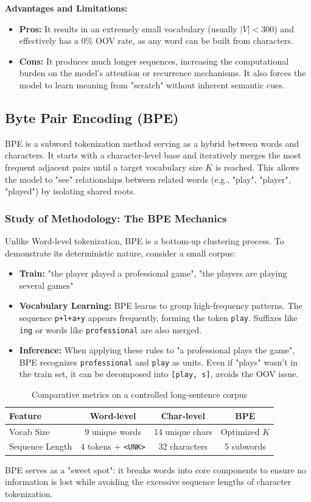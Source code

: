 \textbf{Advantages and Limitations:}
\begin{itemize}
    \item \textbf{Pros:} It results in an extremely small vocabulary (usually $|V| < 300$) and effectively has a 0\% OOV rate, as any word can be built from characters.
    \item \textbf{Cons:} It produces much longer sequences, increasing the computational burden on the model's attention or recurrence mechanisms. It also forces the model to learn meaning from "scratch" without inherent semantic cues.
\end{itemize}

\subsection{Byte Pair Encoding (BPE)}
BPE is a subword tokenization method serving as a hybrid between words and characters. It starts with a character-level base and iteratively merges the most frequent adjacent pairs until a target vocabulary size $K$ is reached. This allows the model to "see" relationships between related words (e.g., "play", "player", "played") by isolating shared roots.

\subsubsection{Study of Methodology: The BPE Mechanics}
Unlike Word-level tokenization, BPE is a bottom-up clustering process. To demonstrate its deterministic nature, consider a small corpus:
\begin{itemize}
    \item \textbf{Train:} "the player played a professional game", "the players are playing several games"
    \item \textbf{Vocabulary Learning:} BPE learns to group high-frequency patterns. The sequence \texttt{p+l+a+y} appears frequently, forming the token \texttt{play}. Suffixes like \texttt{ing} or words like \texttt{professional} are also merged.
    \item \textbf{Inference:} When applying these rules to "a professional plays the game", BPE recognizes \texttt{professional} and \texttt{play} as units. Even if "plays" wasn't in the train set, it can be decomposed into \texttt{[play, s]}, avoids the OOV issue.
\end{itemize}

\begin{table}[H]
\centering
\begin{tabular}{|l|c|c|c|}
\hline
\textbf{Feature} & \textbf{Word-level} & \textbf{Char-level} & \textbf{BPE} \\ \hline
Vocab Size & 9 unique words & 14 unique chars & Optimized $K$ \\ \hline
Sequence Length & 4 tokens + \texttt{<UNK>} & 32 characters & 5 subwords \\ \hline
\end{tabular}
\caption{Comparative metrics on a controlled long-sentence corpus}
\label{tab:bpe_long_comp}
\end{table}

BPE serves as a "sweet spot": it breaks words into core components to ensure no information is lost while avoiding the excessive sequence lengths of character tokenization.
